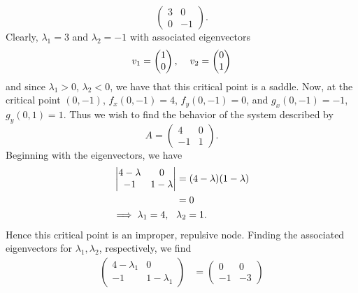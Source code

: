 \documentclass{article}
\begin{document}
\begin{itemize}
\begin{itemize}
\[\begin{pmatrix}
            3 & 0\\
            0 & -1
        \end{pmatrix}.\]
        Clearly, $\lambda_1 = 3$ and $\lambda_2 = -1$ with associated eigenvectors
        \[v_1 = \begin{pmatrix}
            1\\
            0
        \end{pmatrix}, \hspace{0.4cm} v_2 = \begin{pmatrix}
            0\\
            1
        \end{pmatrix}\]
        and since $\lambda_1 > 0$, $\lambda_2 < 0$, we have that this critical point is a saddle.
        \newline\newline
        Now, at the critical point $(0,-1)$, $f_x(0,-1) = 4$, $f_y(0,-1) = 0$, and $g_x(0,-1) = -1$, $g_y(0,1) = 1$. Thus we wish to find the behavior of the system described by
        \[A = \begin{pmatrix}
            4 & 0\\
            -1 & 1
        \end{pmatrix}.\]
        Beginning with the eigenvectors, we have
        \begin{align*}
            \left|\begin{matrix}
                4 - \lambda & 0\\
                -1 & 1 - \lambda
            \end{matrix}\right| &= (4 - \lambda)(1 -\lambda)\\
            &= 0\\
            \implies \lambda_1 = 4, \hspace{0.3cm}& \lambda_2 = 1.
        \end{align*}
        Hence this critical point is an improper, repulsive node. Finding the associated eigenvectors for $\lambda_1, \lambda_2$, respectively, we find
        \begin{align*}
            \begin{pmatrix}
                4 - \lambda_1 & 0\\
                -1 & 1 - \lambda_1
            \end{pmatrix} &= \begin{pmatrix}
                0 & 0\\
                -1 & -3
            \end{pmatrix}

\end{align*}
\end{itemize}
\end{itemize}
\end{document}
